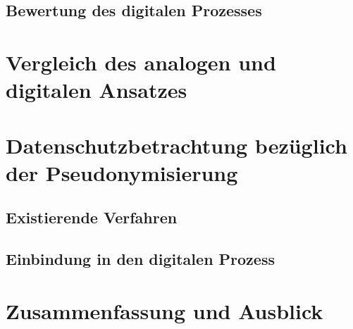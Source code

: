 \documentclass[ngerman]{tudscrreprt}
\begin{document}
\section{Bewertung des digitalen Prozesses}

\chapter{Vergleich des analogen und digitalen Ansatzes}

\chapter{Datenschutzbetrachtung bezüglich der Pseudonymisierung}

\section{Existierende Verfahren}

\section{Einbindung in den digitalen Prozess}

\chapter{Zusammenfassung und Ausblick}
\end{document}
